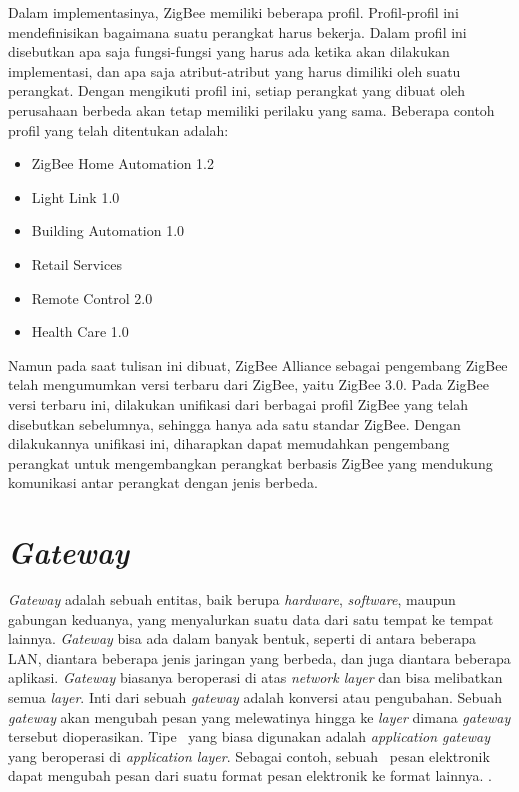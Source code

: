 Dalam implementasinya, ZigBee memiliki beberapa profil. Profil-profil ini mendefinisikan bagaimana suatu perangkat harus bekerja. Dalam profil ini disebutkan apa saja fungsi-fungsi yang harus ada ketika akan dilakukan implementasi, dan apa saja atribut-atribut yang harus dimiliki oleh suatu perangkat. Dengan mengikuti profil ini, setiap perangkat yang dibuat oleh perusahaan berbeda akan tetap memiliki perilaku yang sama. Beberapa contoh profil yang telah ditentukan adalah:
\begin{itemize}
	\item ZigBee Home Automation 1.2
	\item Light Link 1.0
	\item Building Automation 1.0
	\item Retail Services
	\item Remote Control 2.0
	\item Health Care 1.0
\end{itemize}
Namun pada saat tulisan ini dibuat, ZigBee Alliance sebagai pengembang ZigBee telah mengumumkan versi terbaru dari ZigBee, yaitu ZigBee 3.0. Pada ZigBee versi terbaru ini, dilakukan unifikasi dari berbagai profil ZigBee yang telah disebutkan sebelumnya, sehingga hanya ada satu standar ZigBee. Dengan dilakukannya unifikasi ini, diharapkan dapat memudahkan pengembang perangkat untuk mengembangkan perangkat berbasis ZigBee yang mendukung komunikasi antar perangkat dengan jenis berbeda.

\section{\textit{Gateway}}
\textit{Gateway} adalah sebuah entitas, baik berupa \textit{hardware}, \textit{software}, maupun gabungan keduanya, yang menyalurkan suatu data dari satu tempat ke tempat lainnya. \textit{Gateway} bisa ada dalam banyak bentuk, seperti di antara beberapa LAN, diantara beberapa jenis jaringan yang berbeda, dan juga diantara beberapa aplikasi. \textit{Gateway} biasanya beroperasi di atas \textit{network layer} dan bisa melibatkan semua \textit{layer}. Inti dari sebuah \textit{gateway} adalah konversi atau pengubahan. Sebuah \textit{gateway} akan mengubah pesan yang melewatinya hingga ke \textit{layer} dimana \textit{gateway} tersebut dioperasikan. Tipe \gateway~yang biasa digunakan adalah \textit{application gateway} yang beroperasi di \textit{application layer}. Sebagai contoh, sebuah \gateway~pesan elektronik dapat mengubah pesan dari suatu format pesan elektronik ke format lainnya. \cite{GatewayIbmRedbooks}.

